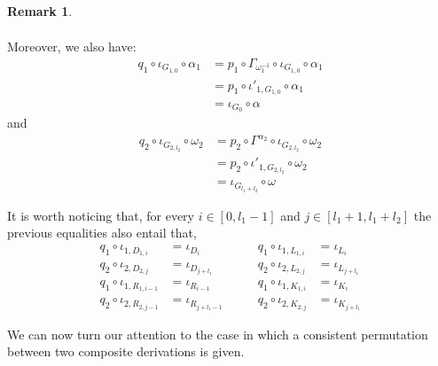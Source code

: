 \documentclass[a4paper]{article}
\theoremstyle{definition}
\newtheorem{remark}[theorem]{Remark}
\begin{document}
\begin{remark}
\begin{itemize}
\[\begin{split}
		\end{split}\]
		Moreover, we also have:
			\begin{align*}
			q_1\circ \iota_{G_{1,0}}\circ \alpha_1&= p_1\circ \Gamma_{\omega^{-1}_1}\circ \iota_{G_{1,0}}\circ \alpha_1 \\&=p_1\circ \iota'_{1, G_{1,0}} \circ \alpha_1 \\&= \iota_{G_{0}}\circ \alpha
			\end{align*} 
		and
			\begin{align*}
		q_2\circ \iota_{G_{2,l_2}}\circ \omega_2&= p_2\circ \Gamma^{\alpha_2}\circ \iota_{G_{2,l_2}}\circ \omega_2 \\&=p_2\circ \iota'_{1, G_{2,l_2}} \circ \omega_2 \\&= \iota_{G_{l_1+l_2}}\circ \omega
			\end{align*}			
			\end{itemize}
		
It is worth noticing that, for every $i\in [0,l_1-1]$ and $j\in [l_1+1, l_1+l_2]$ the previous equalities also entail that,
\[\begin{split}q_1\circ \iota_{1, D_{1,i}}&=\iota_{D_{i}}\\q_2\circ \iota_{2, D_{2,j}}&=\iota_{D_{j+l_1}} 	\\q_1\circ \iota_{1, R_{1,i-1}}&=\iota_{R_{i-1}} \\
	q_2\circ \iota_{2, R_{2,j-1}}&=\iota_{R_{j+l_1-1}}
\end{split} \qquad 
\begin{split}    	q_1\circ \iota_{1, L_{1,i}}&=\iota_{L_{i}} \\q_2\circ \iota_{2, L_{2,j}}&=\iota_{L_{j+l_1}}\\ q_1\circ \iota_{1, K_{1,i}}&=\iota_{K_{i}}\\q_2\circ \iota_{2, K_{2,j}}&=\iota_{K_{j+l_1}}\end{split}\]
\end{remark}

We can now turn our attention to the case in which a consistent permutation between two composite derivations is given.
\end{document}
